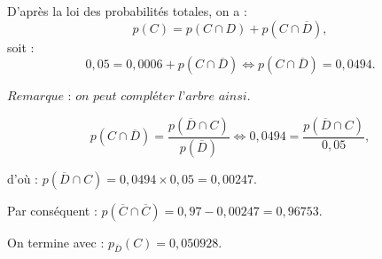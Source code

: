 \documentclass[10pt]{article}
\begin{document}
D'après la loi des probabilités totales, on a :
\[
p(C) = p(C \cap D) + p(C \cap \overline{D}),
\]
soit :
\[
0{,}05 = 0{,}0006 + p(C \cap \overline{D}) \iff p(C \cap \overline{D}) = 0{,}0494.
\]

\(\textit{Remarque : on peut compléter l'arbre ainsi}\). 

\[
p(C \cap \overline{D}) = \dfrac{p(\overline{D} \cap C)}{p(\overline{D})} \iff 0{,}0494 = \dfrac{p(\overline{D} \cap C)}{0{,}05},
\]  

d'où : \(p(\overline{D} \cap C) = 0{,}0494 \times 0{,}05 = 0{,}00247\).

Par conséquent : \(p(\overline{C} \cap \overline{C}) = 0{,}97 - 0{,}00247 = 0{,}96753\).

On termine avec : \(p_{\overline{D}}(C) = 0{,}050928\).
\end{document}
